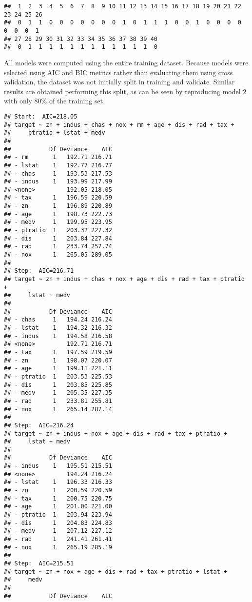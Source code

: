 \documentclass[
]{article}
\begin{document}
\begin{verbatim}
##  1  2  3  4  5  6  7  8  9 10 11 12 13 14 15 16 17 18 19 20 21 22 23 24 25 26 
##  0  1  1  0  0  0  0  0  0  0  1  0  1  1  1  0  0  1  0  0  0  0  0  0  0  1 
## 27 28 29 30 31 32 33 34 35 36 37 38 39 40 
##  0  1  1  1  1  1  1  1  1  1  1  1  1  0
\end{verbatim}

All models were computed using the entire training dataset. Because
models were selected using AIC and BIC metrics rather than evaluating
them using cross validation, the dataset was not initially split in
training and validate. Similar results are obtained performing this
split, as can be seen by reproducing model 2 with only 80\% of the
training set.

\begin{verbatim}
## Start:  AIC=218.05
## target ~ zn + indus + chas + nox + rm + age + dis + rad + tax + 
##     ptratio + lstat + medv
## 
##           Df Deviance    AIC
## - rm       1   192.71 216.71
## - lstat    1   192.77 216.77
## - chas     1   193.53 217.53
## - indus    1   193.99 217.99
## <none>         192.05 218.05
## - tax      1   196.59 220.59
## - zn       1   196.89 220.89
## - age      1   198.73 222.73
## - medv     1   199.95 223.95
## - ptratio  1   203.32 227.32
## - dis      1   203.84 227.84
## - rad      1   233.74 257.74
## - nox      1   265.05 289.05
## 
## Step:  AIC=216.71
## target ~ zn + indus + chas + nox + age + dis + rad + tax + ptratio + 
##     lstat + medv
## 
##           Df Deviance    AIC
## - chas     1   194.24 216.24
## - lstat    1   194.32 216.32
## - indus    1   194.58 216.58
## <none>         192.71 216.71
## - tax      1   197.59 219.59
## - zn       1   198.07 220.07
## - age      1   199.11 221.11
## - ptratio  1   203.53 225.53
## - dis      1   203.85 225.85
## - medv     1   205.35 227.35
## - rad      1   233.81 255.81
## - nox      1   265.14 287.14
## 
## Step:  AIC=216.24
## target ~ zn + indus + nox + age + dis + rad + tax + ptratio + 
##     lstat + medv
## 
##           Df Deviance    AIC
## - indus    1   195.51 215.51
## <none>         194.24 216.24
## - lstat    1   196.33 216.33
## - zn       1   200.59 220.59
## - tax      1   200.75 220.75
## - age      1   201.00 221.00
## - ptratio  1   203.94 223.94
## - dis      1   204.83 224.83
## - medv     1   207.12 227.12
## - rad      1   241.41 261.41
## - nox      1   265.19 285.19
## 
## Step:  AIC=215.51
## target ~ zn + nox + age + dis + rad + tax + ptratio + lstat + 
##     medv
## 
##           Df Deviance    AIC

\end{verbatim}
\end{document}
